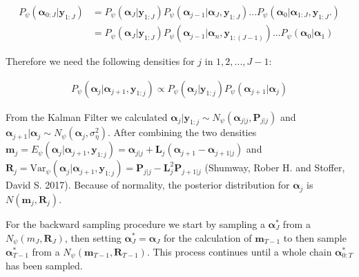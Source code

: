\documentclass[
]{article}
\begin{document}
\begin{equation*}
\begin{aligned}
P_\psi(\boldsymbol{\alpha}_{0:J}|\boldsymbol{y}_{1:J}) &= P_\psi(\boldsymbol{\alpha}_J|\boldsymbol{y}_{1:J})P_\psi(\boldsymbol{\alpha}_{j-1}|\boldsymbol{\alpha}_J, \boldsymbol{y}_{1:J}) ...  P_\psi(\boldsymbol{\alpha}_0|\boldsymbol{\alpha}_{1:J}, \boldsymbol{y}_{1:J}.)\\
&= P_\psi(\boldsymbol{\alpha}_J|\boldsymbol{y}_{1:J})P_\psi(\boldsymbol{\alpha}_{j-1}|\boldsymbol{\alpha}_n, \boldsymbol{y}_{1:(J-1)}) ...  P_\psi(\boldsymbol{\alpha}_0|\boldsymbol{\alpha}_1)
\end{aligned}
\end{equation*}

Therefore we need the following densities for \(j\) in \(1, 2, ..., J-1\):

\begin{equation*}
\begin{aligned}
P_\psi(\boldsymbol{\alpha}_j|\boldsymbol{\alpha}_{j+1}, \boldsymbol{y}_{1:j}) \propto P_\psi(\boldsymbol{\alpha}_j| \boldsymbol{y}_{1:j})P_\psi(\boldsymbol{\alpha}_{j+1}| \boldsymbol{\alpha}_j)
\end{aligned}
\end{equation*}

From the Kalman Filter we calculated \(\boldsymbol{\alpha}_j|\boldsymbol{y}_{1:j} \sim N_\psi(\boldsymbol{\alpha}_{j|j}, \boldsymbol{P}_{j|j})\) and \(\boldsymbol{\alpha}_{j+1}|\boldsymbol{\alpha}_j \sim N_\psi(\boldsymbol{\alpha}_j, \sigma^2_\eta)\). After combining the two densities \(\boldsymbol{m}_j = E_\psi(\boldsymbol{\alpha}_j| \boldsymbol{\alpha}_{j+1},\boldsymbol{y}_{1:j}) = \boldsymbol{\alpha}_{j|j} + \boldsymbol{L}_j (\boldsymbol{\alpha}_{j+1} - \boldsymbol{\alpha}_{j+1|j})\) and \(\boldsymbol{R}_j = \text{Var}_\psi(\boldsymbol{\alpha}_j| \boldsymbol{\alpha}_{j+1},\boldsymbol{y}_{1:j})= \boldsymbol{P}_{j|j} - \boldsymbol{L}_j^2 \boldsymbol{P}_{j+1|j}\) (Shumway, Rober H. and Stoffer, David S. 2017). Because of normality, the posterior distribution for \(\boldsymbol{\alpha}_j\) is \(N(\boldsymbol{m}_j, \boldsymbol{R}_j)\).

For the backward sampling procedure we start by sampling a \(\boldsymbol{\alpha}_J^*\) from a \(N_\psi(m_J, \boldsymbol{R}_J)\), then setting \(\boldsymbol{\alpha}_J^* = \boldsymbol{\alpha}_J\) for the calculation of \(\boldsymbol{m}_{T-1}\) to then sample \(\boldsymbol{\alpha}_{T-1}^*\) from a \(N_\psi(\boldsymbol{m}_{T-1}, \boldsymbol{R}_{T-1})\). This process continues until a whole chain \(\boldsymbol{\alpha}_{0:T}^*\) has been sampled.
\end{document}
